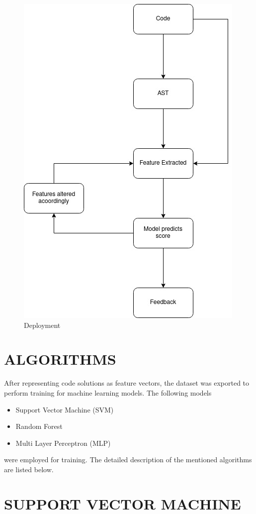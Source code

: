 \begin{figure}[h]
\centering
\includegraphics[scale=0.7]{./Deployment.jpg}
\caption{Deployment}
\label{fig1}
\end{figure}

\section{ALGORITHMS}

After representing code solutions as feature vectors, the dataset was
exported to perform training for machine learning models. The
following models
\begin{itemize}
    \item Support Vector Machine (SVM)
    \item Random Forest 
    \item Multi Layer Perceptron (MLP)
\end{itemize}
were employed for training. The detailed description of the mentioned
algorithms are listed below.

\section{SUPPORT VECTOR MACHINE}

